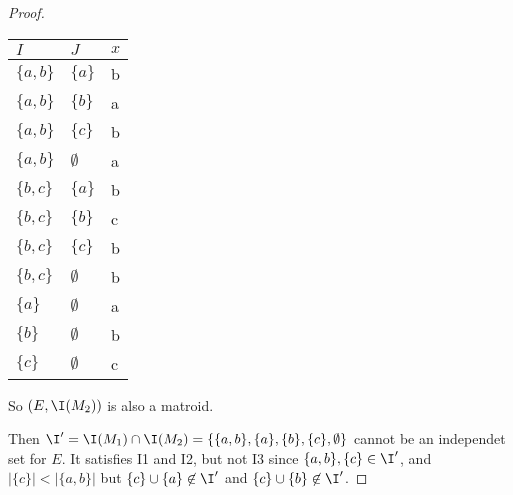 \begin{proof}
   \begin{center}
        \begin{tabular}{ | p{1cm} | p{1cm} | p{1cm} |}
            \hline $I$          & $J$           &   $x$ \\ \hline
            \hline $\{a, b\}$   & $\{a\}$       &  b    \\
            \hline $\{a, b\}$   & $\{b\}$       &  a    \\
            \hline $\{a, b\}$   & $\{c\}$       &  b    \\
            \hline $\{a, b\}$   & $\emptyset$   &  a    \\
            \hline $\{b, c\}$   & $\{a\}$       &  b    \\
            \hline $\{b, c\}$   & $\{b\}$       &  c    \\
            \hline $\{b, c\}$   & $\{c\}$       &  b    \\
            \hline $\{b, c\}$   & $\emptyset$   &  b    \\
            \hline $\{a\}$      & $\emptyset$   &  a    \\
            \hline $\{b\}$      & $\emptyset$   &  b    \\
            \hline $\{c\}$      & $\emptyset$   &  c    \\ \hline
        \end{tabular}    
    \end{center}
    
    So $(E, \I(M_2))$ is also a matroid.\pn
    
    Then $\I' = \I(M_1) \cap \I(M_2) = \{ \{a, b\}, \{a\}, \{b\}, \{c\}, \emptyset \}$ cannot be an independet set for $E$. 
    It satisfies I1 and I2, but not I3 since $\{a, b\}, \{c\} \in \I'$, and $|\{c\}| < |\{a, b\}|$ but 
    $\{c\} \cup \{a\} \not\in \I'$ and $\{c\} \cup \{b\} \not\in \I'$.
\end{proof}